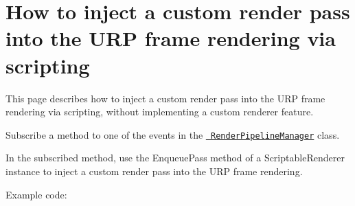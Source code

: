 \chapter{How to inject a custom render pass into the URP frame rendering via scripting}
\hypertarget{md__hey_tea_9_2_library_2_package_cache_2com_8unity_8render-pipelines_8universal_0d14_80_88_2_dof6835e18fbf9eca64786ddddb05a59a9}{}\label{md__hey_tea_9_2_library_2_package_cache_2com_8unity_8render-pipelines_8universal_0d14_80_88_2_dof6835e18fbf9eca64786ddddb05a59a9}
\label{md__hey_tea_9_2_library_2_package_cache_2com_8unity_8render-pipelines_8universal_0d14_80_88_2_dof6835e18fbf9eca64786ddddb05a59a9_autotoc_md2106}%
%
 This page describes how to inject a custom render pass into the URP frame rendering via scripting, without implementing a custom renderer feature.


\begin{DoxyEnumerate}
\item Subscribe a method to one of the events in the \href{https://docs.unity3d.com/ScriptReference/Rendering.RenderPipelineManager.html}{\texttt{ Render\+Pipeline\+Manager}} class.
\item In the subscribed method, use the {\ttfamily Enqueue\+Pass} method of a {\ttfamily Scriptable\+Renderer} instance to inject a custom render pass into the URP frame rendering.
\end{DoxyEnumerate}

Example code\+:



